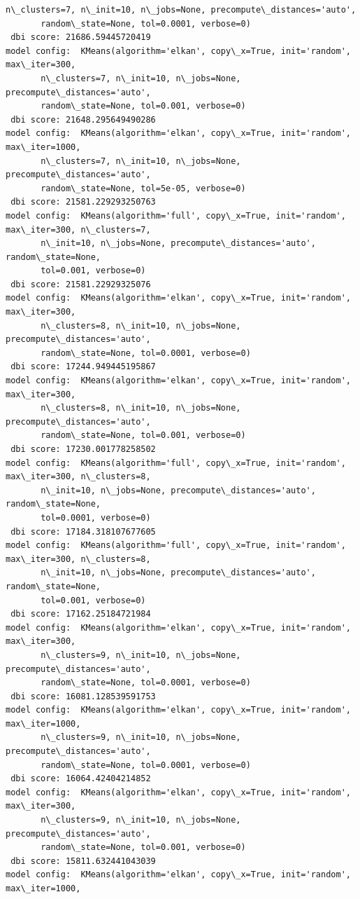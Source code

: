 \documentclass[11pt]{article}
\begin{document}
\begin{Verbatim}[commandchars=\\\{\}]
       n\_clusters=7, n\_init=10, n\_jobs=None, precompute\_distances='auto',
       random\_state=None, tol=0.0001, verbose=0) 
 dbi score: 21686.59445720419
model config:  KMeans(algorithm='elkan', copy\_x=True, init='random', max\_iter=300,
       n\_clusters=7, n\_init=10, n\_jobs=None, precompute\_distances='auto',
       random\_state=None, tol=0.001, verbose=0) 
 dbi score: 21648.295649490286
model config:  KMeans(algorithm='elkan', copy\_x=True, init='random', max\_iter=1000,
       n\_clusters=7, n\_init=10, n\_jobs=None, precompute\_distances='auto',
       random\_state=None, tol=5e-05, verbose=0) 
 dbi score: 21581.229293250763
model config:  KMeans(algorithm='full', copy\_x=True, init='random', max\_iter=300, n\_clusters=7,
       n\_init=10, n\_jobs=None, precompute\_distances='auto', random\_state=None,
       tol=0.001, verbose=0) 
 dbi score: 21581.22929325076
model config:  KMeans(algorithm='elkan', copy\_x=True, init='random', max\_iter=300,
       n\_clusters=8, n\_init=10, n\_jobs=None, precompute\_distances='auto',
       random\_state=None, tol=0.0001, verbose=0) 
 dbi score: 17244.949445195867
model config:  KMeans(algorithm='elkan', copy\_x=True, init='random', max\_iter=300,
       n\_clusters=8, n\_init=10, n\_jobs=None, precompute\_distances='auto',
       random\_state=None, tol=0.001, verbose=0) 
 dbi score: 17230.001778258502
model config:  KMeans(algorithm='full', copy\_x=True, init='random', max\_iter=300, n\_clusters=8,
       n\_init=10, n\_jobs=None, precompute\_distances='auto', random\_state=None,
       tol=0.0001, verbose=0) 
 dbi score: 17184.318107677605
model config:  KMeans(algorithm='full', copy\_x=True, init='random', max\_iter=300, n\_clusters=8,
       n\_init=10, n\_jobs=None, precompute\_distances='auto', random\_state=None,
       tol=0.001, verbose=0) 
 dbi score: 17162.25184721984
model config:  KMeans(algorithm='elkan', copy\_x=True, init='random', max\_iter=300,
       n\_clusters=9, n\_init=10, n\_jobs=None, precompute\_distances='auto',
       random\_state=None, tol=0.0001, verbose=0) 
 dbi score: 16081.128539591753
model config:  KMeans(algorithm='elkan', copy\_x=True, init='random', max\_iter=1000,
       n\_clusters=9, n\_init=10, n\_jobs=None, precompute\_distances='auto',
       random\_state=None, tol=0.0001, verbose=0) 
 dbi score: 16064.42404214852
model config:  KMeans(algorithm='elkan', copy\_x=True, init='random', max\_iter=300,
       n\_clusters=9, n\_init=10, n\_jobs=None, precompute\_distances='auto',
       random\_state=None, tol=0.001, verbose=0) 
 dbi score: 15811.632441043039
model config:  KMeans(algorithm='elkan', copy\_x=True, init='random', max\_iter=1000,

\end{Verbatim}
\end{document}
